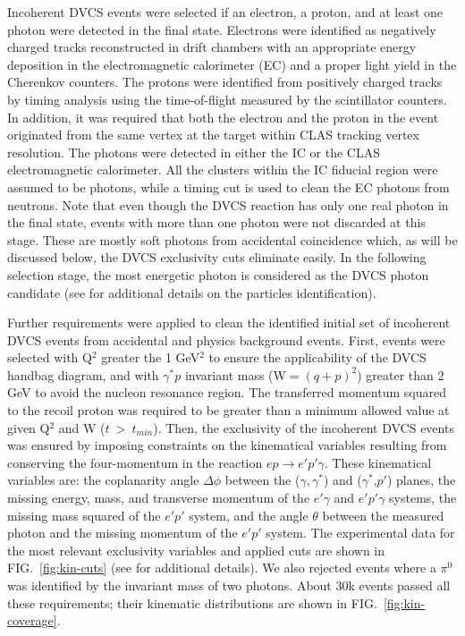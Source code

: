 \documentclass[twocolumn,nofootinbib,showpacs,prl,superscriptaddress,secnumarabic,amssymb,nobibnotes,aps,floatfix]{revtex4}
\begin{document}
Incoherent DVCS events were selected if an electron, a proton, and at least one 
photon were detected in the final state. Electrons were identified as negatively 
charged tracks reconstructed in drift chambers with an appropriate energy 
deposition in the electromagnetic calorimeter (EC) and a proper light yield in 
the Cherenkov counters. The protons were identified from positively charged tracks by 
timing analysis using the time-of-flight measured by the scintillator counters. 
In addition, it was required that both the electron and the proton in the event 
originated from the same vertex at the target within CLAS tracking vertex 
resolution. The photons were detected in either the IC or 
the CLAS electromagnetic calorimeter. All the clusters within the IC fiducial region 
were assumed to be photons, while a timing cut is used to clean the EC photons 
from neutrons. Note that even though the DVCS reaction has only one real photon 
in the final state, events with more than one photon were not discarded at 
this stage. These are mostly soft photons from accidental coincidence which, 
as will be discussed below, the DVCS exclusivity cuts eliminate easily. In the 
following selection stage, the most energetic photon is considered as the DVCS 
photon candidate (see \cite{Hattawy:thesis} for additional details on the 
particles identification).  

Further requirements were applied to clean the identified initial set of 
incoherent DVCS events from accidental and physics background events. First, events were 
selected with Q$^{2}$ greater the 1 GeV$^2$ to ensure the applicability of the 
DVCS handbag diagram, and with $\gamma^{*}p$ invariant mass (W$=(q+p)^2$) greater than 2 GeV to 
avoid the nucleon resonance region. The transferred momentum squared to the recoil proton was required to be greater than a
minimum allowed value at given Q$^2$ and W ($t~>~t_{min}$). Then, the exclusivity of the incoherent DVCS events was 
ensured by imposing constraints on the kinematical variables resulting from 
conserving the four-momentum in the reaction $ep\rightarrow e'p'\gamma$. These 
kinematical variables are: the coplanarity angle $\Delta\phi$ between the 
($\gamma,\gamma^*$) and ($\gamma^*$,$p'$) planes, the missing energy, mass, and 
transverse momentum of the $e'\gamma$ and $e'p'\gamma$ systems, the missing mass 
squared of the $e'p'$ system, and the angle $\theta$ between the measured 
photon and the missing momentum of the $e'p'$ system. The experimental data for 
the most relevant exclusivity variables and applied cuts are shown in 
FIG.~\ref{fig:kin-cuts} (see \cite{Hattawy:thesis} for additional details). We 
also rejected events where a $\pi^0$ was identified by the invariant mass of 
two photons. About 30k events passed all these requirements; their kinematic 
distributions are shown in FIG.~\ref{fig:kin-coverage}.  
\end{document}
